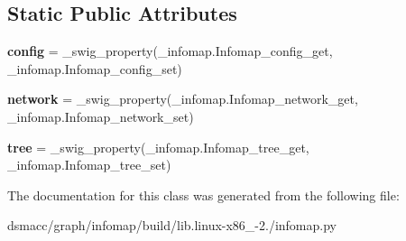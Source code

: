 \subsection*{Static Public Attributes}
\begin{DoxyCompactItemize}
\item 
\mbox{\label{classinfomap_1_1Infomap_a46a1b09fb1eb53cb1eb213e0a062c79f}} 
{\bfseries config} = \+\_\+swig\+\_\+property(\+\_\+infomap.\+Infomap\+\_\+config\+\_\+get, \+\_\+infomap.\+Infomap\+\_\+config\+\_\+set)
\item 
\mbox{\label{classinfomap_1_1Infomap_a26aa2a66d053dd376a6d238a5c75ef7a}} 
{\bfseries network} = \+\_\+swig\+\_\+property(\+\_\+infomap.\+Infomap\+\_\+network\+\_\+get, \+\_\+infomap.\+Infomap\+\_\+network\+\_\+set)
\item 
\mbox{\label{classinfomap_1_1Infomap_aba342972e60862c966040a9d67ac8981}} 
{\bfseries tree} = \+\_\+swig\+\_\+property(\+\_\+infomap.\+Infomap\+\_\+tree\+\_\+get, \+\_\+infomap.\+Infomap\+\_\+tree\+\_\+set)
\end{DoxyCompactItemize}


The documentation for this class was generated from the following file\+:\begin{DoxyCompactItemize}
\item 
dsmacc/graph/infomap/build/lib.\+linux-\/x86\+\_-\/2./infomap.\+py\end{DoxyCompactItemize}
